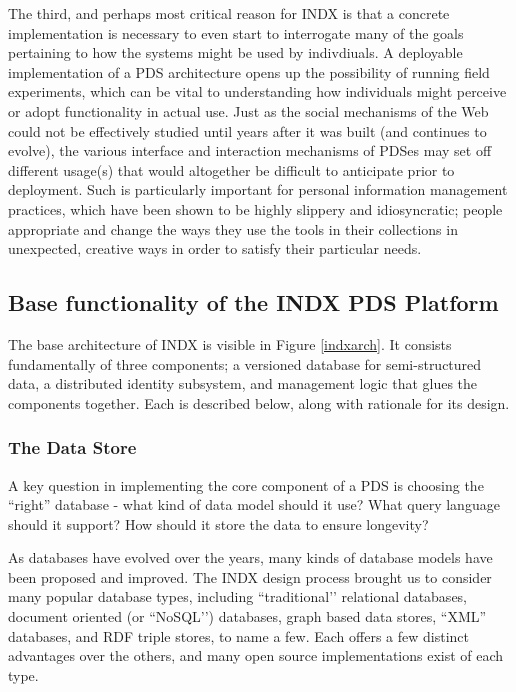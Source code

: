 \documentclass[graybox]{svmult}
\begin{document}
The third, and perhaps most critical reason for INDX is that a concrete implementation is necessary to even start to interrogate many of the goals pertaining to how the systems might be used by indivdiuals.  A deployable implementation of a PDS architecture opens up the possibility of running field experiments, which can be vital to understanding how individuals might perceive or adopt functionality in actual use.  Just as the social mechanisms of the Web could not be effectively studied until years after it was built (and continues to evolve), the various interface and interaction mechanisms of PDSes may set off different usage(s) that would altogether be difficult to anticipate prior to deployment.   Such is particularly important for personal information management practices, which have been shown to be highly slippery and idiosyncratic; people appropriate and change the ways they use the tools in their collections in unexpected, creative ways in order to satisfy their particular needs.

\subsection{Base functionality of the INDX PDS Platform}

The base architecture of INDX is visible in Figure \ref{indxarch}.  It consists fundamentally of three components; a versioned database for semi-structured data, a distributed identity subsystem, and management logic that glues the components together.   Each is described below, along with rationale for its design.

\subsubsection{The Data Store}
A key question in implementing the core component of a PDS is choosing the “right” database - what kind of data model should it use? What query language should it support? How should it store the data to ensure longevity? 

As databases have evolved over the years, many kinds of database models have been proposed and improved.  The INDX design process brought us to consider many popular database types, including ``traditional’’ relational databases, document oriented (or ``NoSQL’’) databases, graph based data stores, “XML” databases, and RDF triple stores, to name a few.  Each offers a few distinct advantages over the others, and many open source implementations exist of each type.
\end{document}
